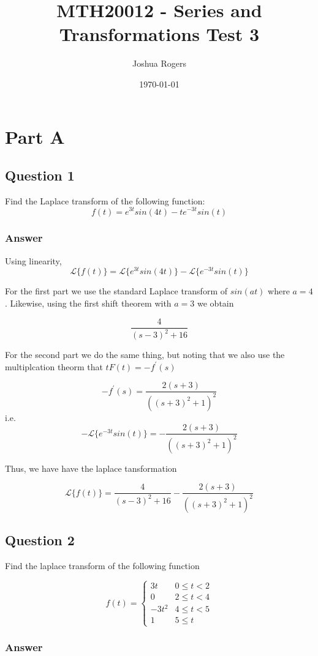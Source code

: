 \documentclass{article}
\title{\vspace{-4cm}MTH20012 - Series and Transformations Test 3}
\author{Joshua Rogers}
\date\today
\begin{document}
\maketitle 

\section*{Part A}
\subsection*{Question 1}
Find the Laplace transform of the following function:
$$f(t) = e^{3t}sin(4t)-te^{-3t}sin(t)$$
\subsubsection*{Answer}

Using linearity,
$$ \mathcal{L}\{f(t)\} = \mathcal{L}\{e^{3t} sin(4t)\} - \mathcal{L}\{e^{-3t} sin(t)\}$$

For the first part we use the standard Laplace transform of $sin(at)$ where $a=4$. Likewise, using the first shift theorem with $a=3$ we obtain

$$\frac{4}{(s-3)^2+16}$$

For the second part we do the same thing, but noting that we also use the multiplcation theorm that $tF(t) = -f^{'}(s)$

$$-f^{'}(s) = \frac{2(s+3)}{\left((s+3)^2+1\right)^2}$$
i.e.
$$- \mathcal{L}\{e^{-3t} sin(t)\} = - \frac{2(s+3)}{\left((s+3)^2+1\right)^2}$$

Thus, we have have the laplace tansformation

$$\mathcal{L}\{f(t)\} = \frac{4}{(s-3)^2+16} - \frac{2(s+3)}{\left((s+3)^2+1\right)^2}$$

\subsection*{Question 2}
Find the laplace transform of the following function

\[ f(t) = \begin{cases}
     3t & 0\leq t < 2 \\
     0 & 2\leq t < 4 \\
     -3t^2 & 4 \leq t < 5 \\
     1 & 5 \leq t
   \end{cases}
\]

\subsubsection*{Answer}
\end{document}

